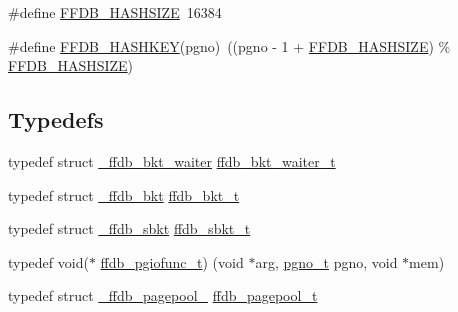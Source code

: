 \begin{DoxyCompactItemize}
\item 
\#define \mbox{\hyperlink{adat-devel_2other__libs_2filedb_2filehash_2ffdb__pagepool_8h_abe1c2fbde9b4b6a95b8a164d7479286f}{F\+F\+D\+B\+\_\+\+H\+A\+S\+H\+S\+I\+ZE}}~16384
\item 
\#define \mbox{\hyperlink{adat-devel_2other__libs_2filedb_2filehash_2ffdb__pagepool_8h_a72d9440d281a400a2589035eddd2e012}{F\+F\+D\+B\+\_\+\+H\+A\+S\+H\+K\+EY}}(pgno)~((pgno -\/ 1 + \mbox{\hyperlink{adat__devel_2other__libs_2filedb_2filehash_2ffdb__pagepool_8h_abe1c2fbde9b4b6a95b8a164d7479286f}{F\+F\+D\+B\+\_\+\+H\+A\+S\+H\+S\+I\+ZE}}) \% \mbox{\hyperlink{adat__devel_2other__libs_2filedb_2filehash_2ffdb__pagepool_8h_abe1c2fbde9b4b6a95b8a164d7479286f}{F\+F\+D\+B\+\_\+\+H\+A\+S\+H\+S\+I\+ZE}})
\end{DoxyCompactItemize}
\subsection*{Typedefs}
\begin{DoxyCompactItemize}
\item 
typedef struct \mbox{\hyperlink{struct__ffdb__bkt__waiter}{\+\_\+ffdb\+\_\+bkt\+\_\+waiter}} \mbox{\hyperlink{adat-devel_2other__libs_2filedb_2filehash_2ffdb__pagepool_8h_accd1d1333df4b3ff0bb77b691fc9d126}{ffdb\+\_\+bkt\+\_\+waiter\+\_\+t}}
\item 
typedef struct \mbox{\hyperlink{struct__ffdb__bkt}{\+\_\+ffdb\+\_\+bkt}} \mbox{\hyperlink{adat-devel_2other__libs_2filedb_2filehash_2ffdb__pagepool_8h_a7d7436d10d66de8bbe2325c37cd7a5ef}{ffdb\+\_\+bkt\+\_\+t}}
\item 
typedef struct \mbox{\hyperlink{struct__ffdb__sbkt}{\+\_\+ffdb\+\_\+sbkt}} \mbox{\hyperlink{adat-devel_2other__libs_2filedb_2filehash_2ffdb__pagepool_8h_a721dc6b888a776fec1cebb5ce4ea68c7}{ffdb\+\_\+sbkt\+\_\+t}}
\item 
typedef void($\ast$ \mbox{\hyperlink{adat-devel_2other__libs_2filedb_2filehash_2ffdb__pagepool_8h_abe9c83a47a1f5babe21df1582aeb8022}{ffdb\+\_\+pgiofunc\+\_\+t}}) (void $\ast$arg, \mbox{\hyperlink{adat-devel_2other__libs_2filedb_2filehash_2ffdb__db_8h_a000813331643d38481142bcce7de1501}{pgno\+\_\+t}} pgno, void $\ast$mem)
\item 
typedef struct \mbox{\hyperlink{struct__ffdb__pagepool__}{\+\_\+ffdb\+\_\+pagepool\+\_\+}} \mbox{\hyperlink{adat-devel_2other__libs_2filedb_2filehash_2ffdb__pagepool_8h_a73290f737b0e5f8be90a0fa96ddf6ab6}{ffdb\+\_\+pagepool\+\_\+t}}
\end{DoxyCompactItemize}
